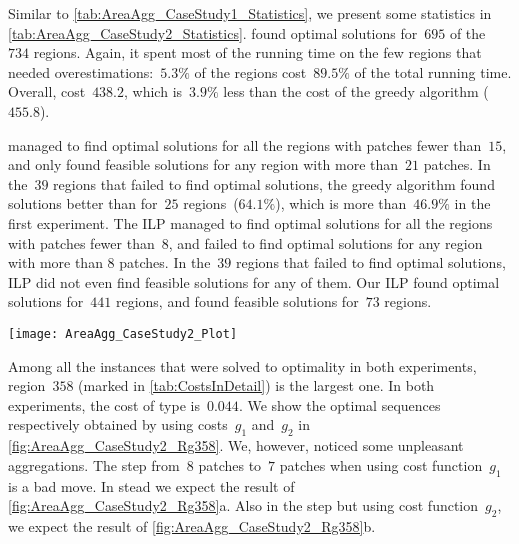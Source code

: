 Similar to \tab\ref{tab:AreaAgg_CaseStudy1_Statistics},
we present some statistics in \tab\ref{tab:AreaAgg_CaseStudy2_Statistics}.
\Astar found optimal solutions for~$695$ of the~$734$ regions.
Again, it spent most of the running time 
on the few regions that needed 
overestimations:~$5.3\%$ of the regions 
cost~$89.5\%$ of the total running time.
Overall, \Astar cost~$438.2$, which is~$3.9\%$ 
less than the cost of the greedy algorithm ($455.8$).

\Astar managed to find optimal solutions 
for all the regions with patches fewer than~$15$, and 
only found feasible solutions for any region 
with more than~$21$ patches.
%
In the~$39$ regions that \Astar failed to find optimal solutions,
the greedy algorithm found solutions better than \Astar 
for~$25$ regions~($64.1\%$), 
which is more than~$46.9\%$ in the first experiment.
%
The ILP managed to find optimal solutions 
for all the regions with patches fewer than~$8$,
and failed to find optimal solutions
for any region with more than $8$ patches.
In the~$39$ regions that \Astar failed to find optimal solutions,
ILP did not even find feasible solutions for any of them.
Our ILP found optimal solutions for~$441$ regions,
and found feasible solutions for~$73$ regions.

\begin{table*}[tb]
	\centering
	\caption{A comparison of Greedy and \Astar		
		when using cost function~$g_2$.
		The notations are the same as 
		\tab\ref{tab:AreaAgg_CaseStudy1_Statistics}.
		Symbols~$g_\mathrm{t}$, $g_\mathrm{l}$, and~$g_2$
		denote the sums of~$g_\mathrm{type}(\Pgoal)$,
		$g_\mathrm{length}(\Pgoal)$, and~$g_2(\Pgoal)$,
		respectively, over all instances (see 
		\eqs\ref{eq:g_type}, \ref{eq:g_length}, 
		and~\ref{eq:g_2}).
	}
	\label{tab:AreaAgg_CaseStudy2_Statistics}
	\texttt{[image: AreaAgg\_CaseStudy2\_Plot]} 
\end{table*}



Among all the instances that were solved to optimality
in both experiments,
region~$358$
(marked in \tab\ref{tab:CostsInDetail})
is the largest one.
In both experiments, the cost of type is~$0.044$.
We show the optimal sequences respectively obtained 
by using costs~$g_1$ and~$g_2$ in
\fig\ref{fig:AreaAgg_CaseStudy2_Rg358}.
We, however, noticed some unpleasant aggregations.
The step from~$8$ patches to~$7$ patches 
when using cost function~$g_1$ is a bad move.
In stead we expect the result of \fig\ref{fig:AreaAgg_CaseStudy2_Rg358}a.
Also in the step but using cost function~$g_2$,
we expect the result of
\fig\ref{fig:AreaAgg_CaseStudy2_Rg358}b.

